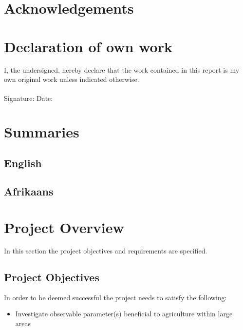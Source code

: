 \newpage
\section{Acknowledgements}
\section{Declaration of own work}

I, the undersigned, hereby declare that the work contained in this report is my own original work
unless indicated otherwise.\\\\

\noindent
Signature: \underline{ }\underline{ } Date: \underline{ }\underline{ }

\section{Summaries}
\subsection{English}
\subsection{Afrikaans}

\tableofcontents
\listoffigures
\listoftables

\newpage


\section{Project Overview}

In this section the project objectives and requirements are specified.

\subsection{Project Objectives}
In order to be deemed successful the project needs to satisfy the following:

\begin{itemize}
    \item Investigate observable parameter(s) beneficial to agriculture within large areas
\end{itemize}

